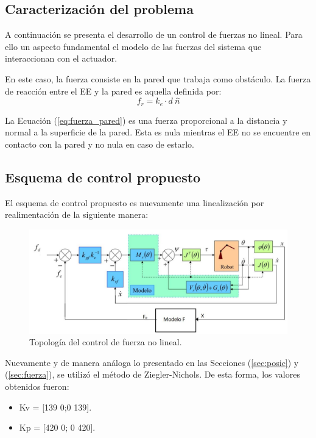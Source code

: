 %

%

\subsection{Caracterización del problema}
A continuación se presenta el desarrollo de un control de fuerzas no lineal. Para ello un aspecto fundamental el modelo de las fuerzas del sistema que interaccionan con el actuador.

En este caso, la fuerza consiste en la pared que trabaja como obstáculo. La fuerza de reacción entre el EE y la pared es aquella definida por:
\begin{equation}
f_r = k_e \cdot d \ \hat{n}
\label{eq:fuerza_pared}
\end{equation}

La Ecuación (\ref{eq:fuerza_pared}) es una fuerza proporcional a la distancia y normal a la superficie de la pared. Esta es nula mientras el EE no se encuentre en contacto con la pared y no nula en caso de estarlo.

\subsection{Esquema de control propuesto}
El esquema de control propuesto es nuevamente una linealización por realimentación de la siguiente manera:

\begin{figure}[H]
	\centering
	\includegraphics[width=0.8\linewidth]{ImagenesControl de fuerza no lineal/controlf}
	\caption{Topología del control de fuerza no lineal.}	
	\label{fig:control_f_modelo}
\end{figure}


Nuevamente y de manera análoga lo presentado en las Secciones (\ref{sec:posic}) y (\ref{sec:fuerza}), se utilizó el método de Ziegler-Nichols. De esta forma, los valores obtenidos fueron:
\begin{itemize}
	\item Kv = [139 0;0 139].
	\item Kp = [420 0; 0 420].
\end{itemize}

